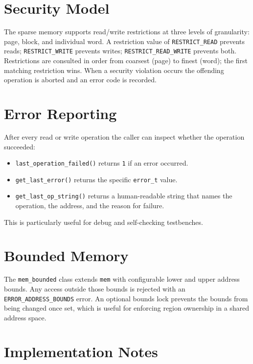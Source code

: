 \documentclass[11pt,letterpaper]{report}
\begin{document}
\section*{Security Model}

The sparse memory supports read/write restrictions at three levels of
granularity: page, block, and individual word.  A restriction value of
\texttt{RESTRICT\_READ} prevents reads; \texttt{RESTRICT\_WRITE} prevents
writes; \texttt{RESTRICT\_READ\_WRITE} prevents both.  Restrictions are
consulted in order from coarsest (page) to finest (word); the first
matching restriction wins.  When a security violation occurs the offending
operation is aborted and an error code is recorded.

\section*{Error Reporting}

After every read or write operation the caller can inspect whether the
operation succeeded:

\begin{itemize}
  \item \texttt{last\_operation\_failed()} returns \texttt{1} if an
    error occurred.
  \item \texttt{get\_last\_error()} returns the specific
    \texttt{error\_t} value.
  \item \texttt{get\_last\_op\_string()} returns a human-readable
    string that names the operation, the address, and the reason for
    failure.
\end{itemize}

This is particularly useful for debug and self-checking testbenches.

\section*{Bounded Memory}

The \texttt{mem\_bounded} class extends \texttt{mem} with configurable
lower and upper address bounds.  Any access outside those bounds is
rejected with an \texttt{ERROR\_ADDRESS\_BOUNDS} error.  An optional
bounds lock prevents the bounds from being changed once set, which is
useful for enforcing region ownership in a shared address space.

\section*{Implementation Notes}
\end{document}
